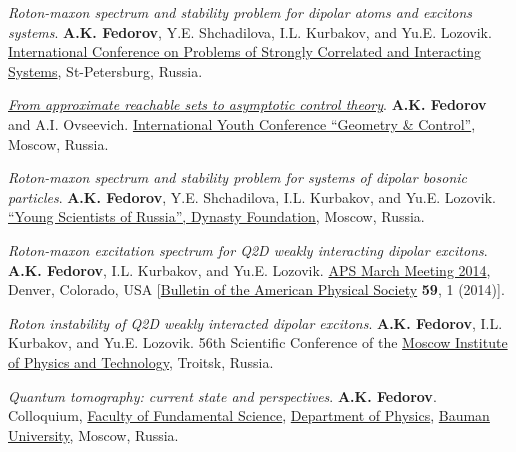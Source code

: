\documentclass[10pt,a4paper,sans]{moderncv}
\begin{document}
	{\textit{Roton-maxon spectrum and stability problem for dipolar atoms and excitons systems}.
	\textbf{A.K. Fedorov}, Y.E. Shchadilova, I.L. Kurbakov, and Yu.E. Lozovik.
	\textcolor{blue}{\href{http://www.mifp.eu/SCHOOLS/RQC-2014/}{International Conference on Problems of Strongly Correlated and Interacting Systems}},
	 St-Petersburg, Russia.}

	{\textit{\textcolor{blue}{\href{http://www.mathnet.ru/php/presentation.phtml?option_lang=rus&presentid=8938}
	{From approximate reachable sets to asymptotic control theory}}}.
	\textbf{A.K. Fedorov} and A.I. Ovseevich.
	\textcolor{blue}{\href{http://gc2014.mi.ras.ru}{International Youth Conference ``Geometry \& Control''}},
	Moscow, Russia.}

	{\textit{Roton-maxon spectrum and stability problem for systems of dipolar bosonic particles}.
	\textbf{A.K. Fedorov}, Y.E. Shchadilova, I.L. Kurbakov, and Yu.E. Lozovik.
	\textcolor{blue}{\href{http://dynastyfdn.ru}{``Young Scientists of Russia'', Dynasty Foundation}},
	Moscow, Russia.}

	{\textit{Roton-maxon excitation spectrum for Q2D weakly interacting dipolar excitons}.
	\textbf{A.K. Fedorov}, I.L. Kurbakov, and Yu.E. Lozovik.
	\textcolor{blue}{\href{http://www.rqc.ru/events/?ELEMENT_ID=888}{APS March Meeting 2014}},
	Denver, Colorado, USA
	[\textcolor{blue}{\href{http://dx.doi.org/10.1088/1742-6596/414/1/012036}{Bulletin of the American Physical Society}}
	\textbf{59}, 1 (2014)].}

	{\textit{Roton instability of Q2D weakly interacted dipolar excitons}.
	\textbf{A.K. Fedorov}, I.L. Kurbakov, and Yu.E. Lozovik.
	56th Scientific Conference of the \textcolor{blue}{\href{http://mipt.ru/en/}{Moscow Institute of Physics and Technology}}, 
	Troitsk, Russia.}
	
	{\textit{Quantum tomography: current state and perspectives}.
	\textbf{A.K. Fedorov}.
	Colloquium, 
	\textcolor{blue}{\href{http://fn.bmstu.ru/}{Faculty of Fundamental Science}},
	\textcolor{blue}{\href{http://fn.bmstu.ru/index.php/fn4}{Department of Physics}},
	\textcolor{blue}{\href{http://bmstu.ru/}{Bauman University}}, Moscow, Russia.}
	
\end{document}
